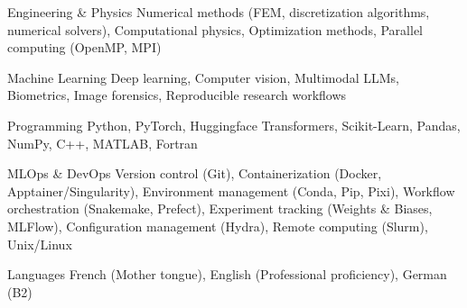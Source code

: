 

\begin{cvskills}

  \cvskill
    {Engineering \& Physics} %
    {Numerical methods (FEM, discretization algorithms, numerical solvers), Computational physics, Optimization methods, Parallel computing (OpenMP, MPI)} %
  
\cvskill
    {Machine Learning} %
    {Deep learning, Computer vision, Multimodal LLMs, Biometrics, Image forensics, Reproducible research workflows} %

  \cvskill
    {Programming} %
    {Python, PyTorch, Huggingface Transformers, Scikit-Learn, Pandas, NumPy, C++, MATLAB, Fortran} %


  \cvskill
    {MLOps \& DevOps} %
    {Version control (Git), Containerization (Docker, Apptainer/Singularity), Environment management (Conda, Pip, Pixi), Workflow orchestration (Snakemake, Prefect), Experiment tracking (Weights \& Biases, MLFlow), Configuration management (Hydra), Remote computing (Slurm), Unix/Linux} %

  \cvskill
    {Languages} %
    {French (Mother tongue), English (Professional proficiency), German (B2)} %

\end{cvskills}
